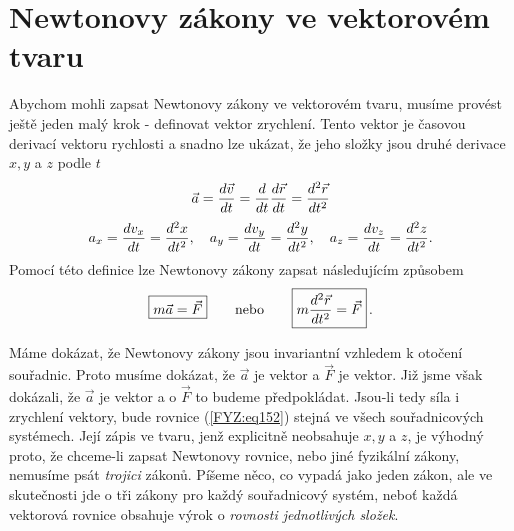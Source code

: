   \section{Newtonovy zákony ve vektorovém tvaru}
    Abychom mohli zapsat Newtonovy zákony ve vektorovém tvaru, musíme provést ještě jeden malý krok 
    - definovat vektor zrychlení. Tento vektor je časovou derivací vektoru rychlosti a snadno lze 
    ukázat, že jeho složky jsou druhé derivace \(x, y\) a \(z\) podle \(t\)
    \begin{equation}\label{FYZ:eq150}
      \vec{a} = \dfrac{d \vec{v}}{d t} = \dfrac{d  }{d t}\dfrac{d \vec{r}}{d t} = \dfrac{d^2 \vec{r}}{d t^2}
    \end{equation}
    \begin{equation*}                   %
      a_x = \der{v_x}{t} = \dder{x}{t}, \quad
      a_y = \der{v_y}{t} = \dder{y}{t}, \quad
      a_z = \der{v_z}{t} = \dder{z}{t}.
    \end{equation*}
     Pomocí této definice lze Newtonovy zákony zapsat následujícím způsobem
    \begin{equation}\label{FYZ:eq152}
      \boxed{m\vec{a} = \vec{F}} \qquad\text{nebo}\qquad  \boxed{m\dfrac{d^2 \vec{r}}{d t^2} = \vec{F}}\,.
    \end{equation}
     
     Máme dokázat, že Newtonovy zákony jsou invariantní vzhledem k otočení souřadnic. Proto musíme 
     dokázat, že \(\vec{a}\) je vektor a \(\vec{F}\) je vektor. Již jsme však dokázali, že 
     \(\vec{a}\) je vektor a o \(\vec{F}\) to budeme předpokládat. Jsou-li tedy síla i zrychlení 
     vektory, bude rovnice (\ref{FYZ:eq152}) stejná ve všech souřadnicových systémech. Její zápis 
     ve tvaru, jenž explicitně neobsahuje \(x, y\) a \(z\), je výhodný proto, že chceme-li zapsat 
     Newtonovy rovnice, nebo jiné fyzikální zákony, nemusíme psát \emph{trojici} zákonů. Píšeme 
     něco, co vypadá jako jeden zákon, ale ve skutečnosti jde o tři zákony pro každý souřadnicový 
     systém, neboť každá vektorová rovnice obsahuje výrok o \emph{rovnosti jednotlivých složek}. 
     
